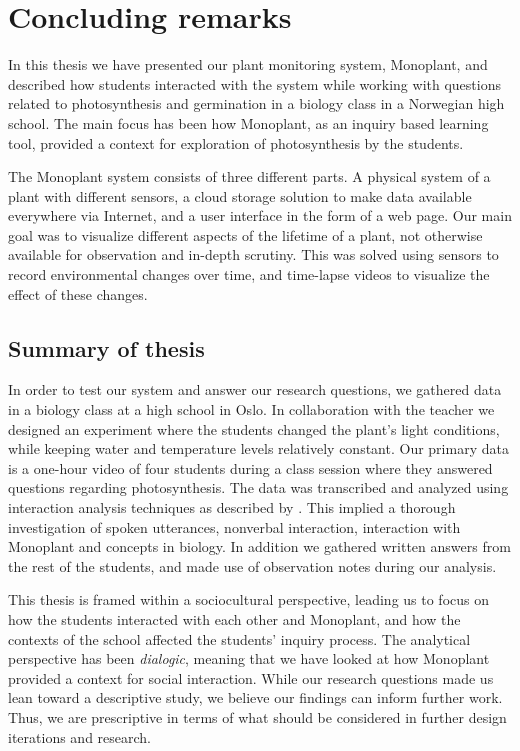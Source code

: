 \chapter{Concluding remarks}
In this thesis we have presented our plant monitoring system, Monoplant, and described how students interacted with the system while working with questions related to photosynthesis and germination in a biology class in a Norwegian high school. The main focus has been how Monoplant, as an inquiry based learning tool, provided a context for exploration of photosynthesis by the students. 

The Monoplant system consists of three different parts. A physical system of a plant with different sensors, a cloud storage solution to make data available everywhere via Internet, and a user interface in the form of a web page. Our main goal was to visualize different aspects of the lifetime of a plant, not otherwise available for observation and in-depth scrutiny. This was solved using sensors to record environmental changes over time, and time-lapse videos to visualize the effect of these changes. 

\section{Summary of thesis}
In order to test our system and answer our research questions, we gathered data in a biology class at a high school in Oslo. In collaboration with the teacher we designed an experiment where the students changed the plant's light conditions, while keeping water and temperature levels relatively constant. Our primary data is a one-hour video of four students during a class session where they answered questions regarding photosynthesis. The data was transcribed and analyzed using interaction analysis techniques as described by \citet{jordan1995interaction}. This implied a thorough investigation of spoken utterances, nonverbal interaction, interaction with Monoplant and concepts in biology. In addition we gathered written answers from the rest of the students, and made use of observation notes during our analysis. 

This thesis is framed within a sociocultural perspective, leading us to focus on how the students interacted with each other and Monoplant, and how the contexts of the school affected the students' inquiry process. The analytical perspective has been \emph{dialogic}, meaning that we have looked at how Monoplant provided a context for social interaction. While our research questions made us lean toward a descriptive study, we believe our findings can inform further work. Thus, we are prescriptive in terms of what should be considered in further design iterations and research.


